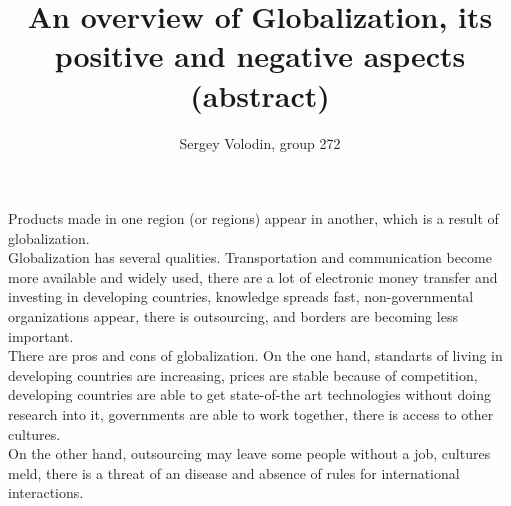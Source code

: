 \documentclass[a4paper]{article}
\author{Sergey Volodin, group 272}
\title{An overview of Globalization, its positive and negative aspects\\(abstract)}
\begin{document}
\maketitle
{\Large
Products made in one region (or regions) appear in another, which is a result of globalization.
\\[5pt]
Globalization has several qualities. Transportation and communication become more available and widely used, there are a lot of electronic money transfer and investing in developing countries, knowledge spreads fast, non-governmental organizations appear, there is outsourcing, and borders are becoming less important.
\\[5pt]
There are pros and cons of globalization. On the one hand, standarts of living in developing countries are increasing, prices are stable because of competition, developing countries are able to get state-of-the art technologies without doing research into it, governments are able to work together, there is access to other cultures.
\\[5pt]
On the other hand, outsourcing may leave some people without a job, cultures meld, there is a threat of an disease and absence of rules for international interactions.}
\end{document}
